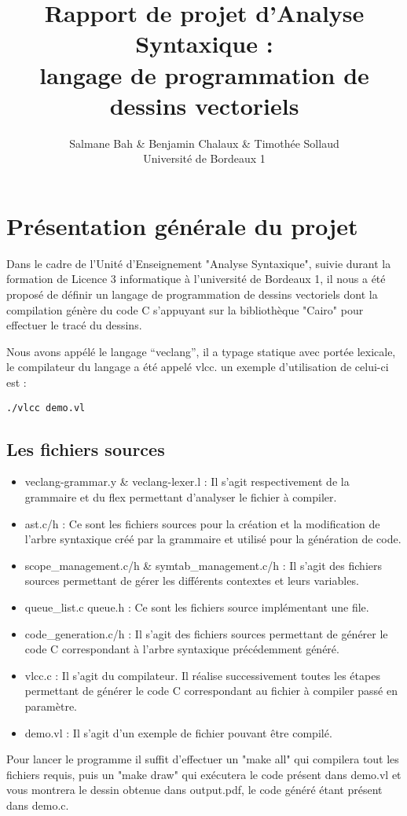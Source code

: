 \documentclass[a4paper,titlepage]{article}
\title{Rapport de projet d'Analyse Syntaxique :\\
\bf{langage de programmation de dessins vectoriels}}
\author{Salmane Bah \& Benjamin Chalaux \& Timothée Sollaud\\
Université de Bordeaux 1}
\begin{document}
\maketitle
\newpage
{} %
\tableofcontents	
\newpage

\section{Présentation générale du projet}

Dans le cadre de l'Unité d'Enseignement "Analyse Syntaxique", suivie durant la formation de Licence 3 informatique à l'université de Bordeaux 1, il nous a été proposé de définir un langage de programmation de dessins vectoriels dont la compilation génère du code C s'appuyant sur la bibliothèque "Cairo" pour effectuer le tracé du dessins.

Nous avons appélé le langage ``veclang'', il a typage statique avec portée lexicale, le compilateur du langage a été 
appelé vlcc. un exemple d'utilisation de celui-ci est : 
\lstset{language=C}
\begin{lstlisting}[frame=single]
  ./vlcc demo.vl
\end{lstlisting}
\subsection{Les fichiers sources}
\begin{itemize}
\item veclang-grammar.y \& veclang-lexer.l : Il s'agit respectivement de la grammaire et du flex permettant d'analyser le fichier à compiler.
\item ast.c/h : Ce sont les fichiers sources pour la création et la modification de l'arbre syntaxique créé par la grammaire et utilisé pour la génération de code.
\item scope\_management.c/h \& symtab\_management.c/h : Il s'agit des fichiers sources permettant de gérer les différents contextes et leurs variables.
\item queue\_list.c queue.h : Ce sont les fichiers source implémentant une file.
\item code\_generation.c/h : Il s'agit des fichiers sources permettant de générer le code C correspondant à l'arbre syntaxique précédemment généré.
\item vlcc.c : Il s'agit du compilateur. Il réalise successivement toutes les étapes permettant de générer le code C correspondant au fichier à compiler passé en paramètre.
\item demo.vl : Il s'agit d'un exemple de fichier pouvant être compilé.
\end{itemize}
Pour lancer le programme il suffit d'effectuer un "make all" qui compilera tout les fichiers requis, puis un "make draw" qui exécutera le code présent dans demo.vl et vous montrera le dessin obtenue dans output.pdf, le code généré étant présent dans demo.c.
\end{document}
